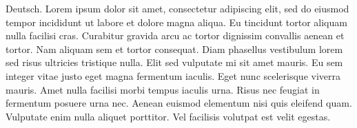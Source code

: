 Deutsch.
Lorem ipsum dolor sit amet, consectetur adipiscing elit, sed do eiusmod tempor incididunt ut labore et dolore magna aliqua.
Eu tincidunt tortor aliquam nulla facilisi cras.
Curabitur gravida arcu ac tortor dignissim convallis aenean et tortor.
Nam aliquam sem et tortor consequat.
Diam phasellus vestibulum lorem sed risus ultricies tristique nulla.
Elit sed vulputate mi sit amet mauris.
Eu sem integer vitae justo eget magna fermentum iaculis.
Eget nunc scelerisque viverra mauris.
Amet nulla facilisi morbi tempus iaculis urna.
Risus nec feugiat in fermentum posuere urna nec.
Aenean euismod elementum nisi quis eleifend quam.
Vulputate enim nulla aliquet porttitor.
Vel facilisis volutpat est velit egestas.
